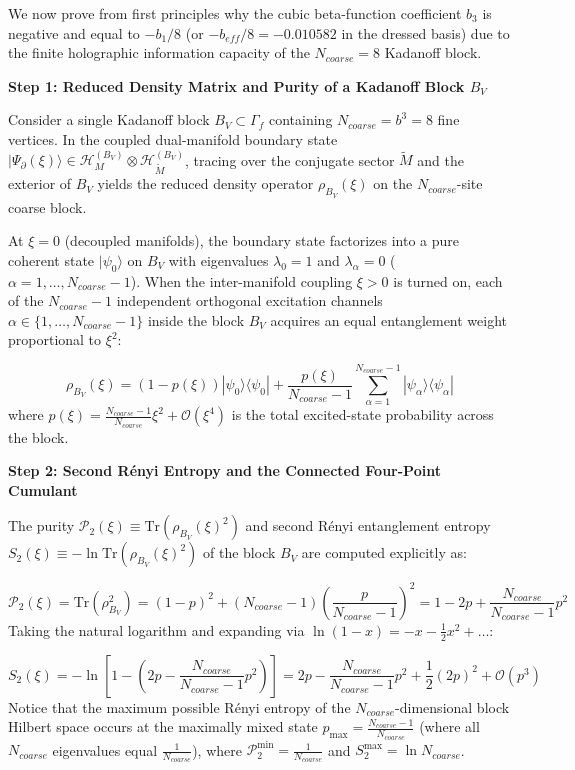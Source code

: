 \documentclass[aps,prd,onecolumn,superscriptaddress,nofootinbib,longbibliography,10pt]{revtex4-2}
\begin{document}
  We now prove from first principles why the cubic beta-function coefficient \(b_3\) is negative and equal to \(-b_1/8\) (or \(-b_{eff}/8 = -0.010582\) in the dressed basis) due to the finite holographic information capacity of the \(N_{coarse} = 8\) Kadanoff block.


  \textbf{Step 1: Reduced Density Matrix and Purity of a Kadanoff Block \(B_V\)}


  Consider a single Kadanoff block \(B_V \subset \Gamma_f\) containing \(N_{coarse} = b^3 = 8\) fine vertices. In the coupled dual-manifold boundary state \(|\Psi_\partial(\xi)\rangle \in \mathcal{H}_M^{(B_V)} \otimes \mathcal{H}_{\tilde{M}}^{(B_V)}\), tracing over the conjugate sector \(\tilde{M}\) and the exterior of \(B_V\) yields the reduced density operator \(\rho_{B_V}(\xi)\) on the \(N_{coarse}\)-site coarse block.


  At \(\xi = 0\) (decoupled manifolds), the boundary state factorizes into a pure coherent state \(|\psi_0\rangle\) on \(B_V\) with eigenvalues \(\lambda_0 = 1\) and \(\lambda_\alpha = 0\) (\(\alpha = 1, \dots, N_{coarse} - 1\)). When the inter-manifold coupling \(\xi > 0\) is turned on, each of the \(N_{coarse} - 1\) independent orthogonal excitation channels \(\alpha \in \{1, \dots, N_{coarse} - 1\}\) inside the block \(B_V\) acquires an equal entanglement weight proportional to \(\xi^2\):


  \[ \rho_{B_V}(\xi) = (1 - p(\xi))|\psi_0\rangle\langle\psi_0| + \frac{p(\xi)}{N_{coarse} - 1}\sum_{\alpha=1}^{N_{coarse}-1} |\psi_\alpha\rangle\langle\psi_\alpha| \]
  where \(p(\xi) = \frac{N_{coarse}-1}{N_{coarse}}\xi^2 + \mathcal{O}(\xi^4)\) is the total excited-state probability across the block.


  \textbf{Step 2: Second Rényi Entropy and the Connected Four-Point Cumulant}


  The purity \(\mathcal{P}_2(\xi) \equiv \text{Tr}(\rho_{B_V}(\xi)^2)\) and second Rényi entanglement entropy \(S_2(\xi) \equiv -\ln\text{Tr}(\rho_{B_V}(\xi)^2)\) of the block \(B_V\) are computed explicitly as:


  \[ \mathcal{P}_2(\xi) = \text{Tr}(\rho_{B_V}^2) = (1 - p)^2 + (N_{coarse} - 1)\left(\frac{p}{N_{coarse} - 1}\right)^2 = 1 - 2p + \frac{N_{coarse}}{N_{coarse} - 1}p^2 \]
  Taking the natural logarithm and expanding via \(\ln(1 - x) = -x - \frac{1}{2}x^2 + \dots\):


  \[ S_2(\xi) = -\ln\left[ 1 - \left(2p - \frac{N_{coarse}}{N_{coarse} - 1}p^2\right) \right] = 2p - \frac{N_{coarse}}{N_{coarse} - 1}p^2 + \frac{1}{2}(2p)^2 + \mathcal{O}(p^3) \]
  Notice that the maximum possible Rényi entropy of the \(N_{coarse}\)-dimensional block Hilbert space occurs at the maximally mixed state \(p_{\max} = \frac{N_{coarse}-1}{N_{coarse}}\) (where all \(N_{coarse}\) eigenvalues equal \(\frac{1}{N_{coarse}}\)), where \(\mathcal{P}_2^{\min} = \frac{1}{N_{coarse}}\) and \(S_2^{\max} = \ln N_{coarse}\).
\end{document}
